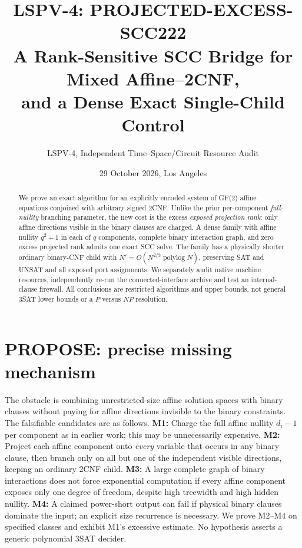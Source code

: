 \documentclass[11pt]{article}
\title{LSPV-4: PROJECTED-EXCESS-SCC222\\\large A Rank-Sensitive SCC Bridge for Mixed Affine--2CNF,\\and a Dense Exact Single-Child Control}
\author{LSPV-4, Independent Time--Space/Circuit Resource Audit}
\date{29 October 2026, Los Angeles}
\begin{document}
\maketitle
\begin{abstract}
We prove an exact algorithm for an explicitly encoded system of GF(2) affine equations conjoined with arbitrary signed 2CNF. Unlike the prior per-component \emph{full-nullity} branching parameter, the new cost is the excess \emph{exposed projection rank}: only affine directions visible in the binary clauses are charged. A dense family with affine nullity $q^2+1$ in each of $q$ components, complete binary interaction graph, and zero excess projected rank admits one exact SCC solve. The family has a physically shorter ordinary binary-CNF child with $N'=O(N^{2/3}\operatorname{polylog}N)$, preserving SAT and UNSAT and all exposed port assignments. We separately audit native machine resources, independently re-run the connected-interface archive and test an internal-clause firewall. All conclusions are restricted algorithms and upper bounds, not general $3$SAT lower bounds or a $P$ versus $NP$ resolution.
\end{abstract}

\section{PROPOSE: precise missing mechanism}
The obstacle is combining unrestricted-size affine solution spaces with binary clauses without paying for affine directions invisible to the binary constraints. The falsifiable candidates are as follows. \textbf{M1:} Charge the full affine nullity $d_i-1$ per component as in earlier work; this may be unnecessarily expensive. \textbf{M2:} Project each affine component onto \emph{every} variable that occurs in any binary clause, then branch only on all but one of the independent visible directions, keeping an ordinary 2CNF child. \textbf{M3:} A large complete graph of binary interactions does not force exponential computation if every affine component exposes only one degree of freedom, despite high treewidth and high hidden nullity. \textbf{M4:} A claimed power-short output can fail if physical binary clauses dominate the input; an explicit size recurrence is necessary. We prove M2--M4 on specified classes and exhibit M1's excessive estimate. No hypothesis asserts a generic polynomial 3SAT decider.
\end{document}
